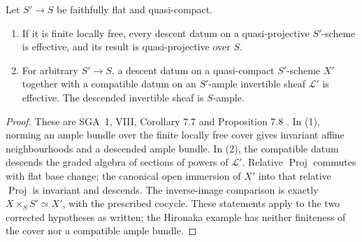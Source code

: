 \begin{proposition}\label{A:polarized-descent}
Let $S'\to S$ be faithfully flat and quasi-compact.
\begin{enumerate}
\item If it is finite locally free, every descent datum on a
quasi-projective $S'$-scheme is effective, and its result is
quasi-projective over $S$.
\item For arbitrary $S'\to S$, a descent datum on a quasi-compact
$S'$-scheme $X'$ together with a compatible datum on an $S'$-ample
invertible sheaf $\mathscr L'$ is effective. The descended invertible
sheaf is $S$-ample.
\end{enumerate}
\end{proposition}
\begin{proof}
These are SGA~1, VIII, Corollary 7.7 and Proposition 7.8
\cite{SGA1VIII7}. In (1), norming an ample bundle over the finite
locally free cover gives invariant affine neighbourhoods and a
descended ample bundle. In (2), the compatible datum descends the
graded algebra of sections of powers of $\mathscr L'$. Relative
$\operatorname{Proj}$ commutes with flat base change; the canonical
open immersion of $X'$ into that relative $\operatorname{Proj}$
is invariant and descends. The inverse-image comparison is exactly
$X\times_S S'\simeq X'$, with the prescribed cocycle. These statements
apply to the two corrected hypotheses as written; the Hironaka
example has neither finiteness of the cover nor a compatible ample
bundle.
\end{proof}
